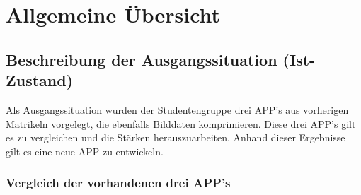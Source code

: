 %
%	


\section{Allgemeine Übersicht}

\subsection{\textbf{Beschreibung der Ausgangssituation (Ist-Zustand) }}

Als Ausgangssituation wurden der Studentengruppe drei \acs{APP}'s aus vorherigen Matrikeln vorgelegt, die ebenfalls Bilddaten komprimieren. Diese drei \acs{APP}'s gilt es zu vergleichen und die Stärken herauszuarbeiten. Anhand dieser Ergebnisse gilt es eine neue \acs{APP} zu entwickeln.


\subsubsection{Vergleich der vorhandenen drei \acs{APP}'s}
\begin{landscape}
%
%
%
%
%
%
%

\newpage



\end{landscape}


